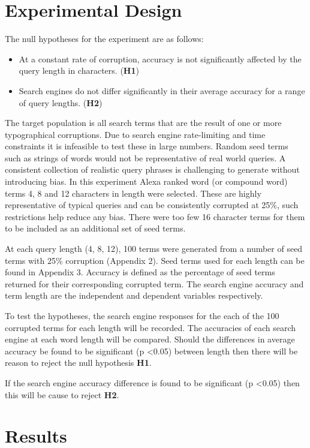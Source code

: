\documentclass{csfourzero}
\begin{document}
\section{Experimental Design}
\label{sec:exp}

The null hypotheses for the experiment are as follows:
\begin{itemize}
  \item{At a constant rate of corruption, accuracy is not significantly affected by the query length in characters. (\textbf{H1})}
  \item{Search engines do not differ significantly in their average accuracy for a range of query lengths. (\textbf{H2})}
\end{itemize}

The target population is all search terms that are the result of one or more typographical corruptions. Due to search engine rate-limiting and time constraints it is infeasible to test these in large numbers. Random seed terms such as strings of words would not be representative of real world queries. A consistent collection of realistic query phrases is challenging to generate without introducing bias. In this experiment Alexa ranked word (or compound word) terms 4, 8 and 12 characters in length were selected. These are highly representative of typical queries and can be consistently corrupted at 25\%, such restrictions help reduce any bias. There were too few 16 character terms for them to be included as an additional set of seed terms.

At each query length (4, 8, 12), 100 terms were generated from a number of seed terms with 25\% corruption (Appendix 2). Seed terms used for each length can be found in Appendix 3. Accuracy is defined as the percentage of seed terms returned for their corresponding corrupted term. The search engine accuracy and term length are the independent and dependent variables respectively.

To test the hypotheses, the search engine responses for the each of the 100 corrupted terms for each length will be recorded. The accuracies of each search engine at each word length will be compared. Should the differences in average accuracy be found to be significant (p \textless 0.05) between length then there will be reason to reject the null hypothesis \textbf{H1}.

If the search engine accuracy difference is found to be significant (p \textless 0.05) then this will be cause to reject \textbf{H2}.

\section{Results}
\label{sec:results}
\end{document}
